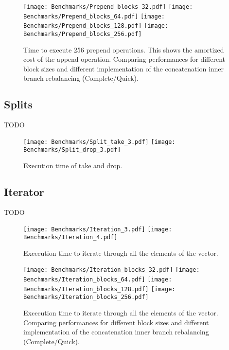 \begin{figure}[h!]
  \centering
  \texttt{[image: Benchmarks/Prepend\_blocks\_32.pdf]}
  \texttt{[image: Benchmarks/Prepend\_blocks\_64.pdf]}
  \texttt{[image: Benchmarks/Prepend\_blocks\_128.pdf]}
  \texttt{[image: Benchmarks/Prepend\_blocks\_256.pdf]}
  \label{PrependBenchmarks}
  \caption{Time to execute 256 prepend operations. This shows the amortized cost of the append operation. Comparing performances for different block sizes and different implementation of the concatenation inner branch rebalancing (Complete/Quick).}
\end{figure}


\subsection{Splits}
\color{red} TODO \color{black}

\begin{figure}[h!]
  \centering
  \texttt{[image: Benchmarks/Split\_take\_3.pdf]}
  \texttt{[image: Benchmarks/Split\_drop\_3.pdf]}
  \label{SplitsBenchmarks}
  \caption{Execution time of take and drop.}
\end{figure}


\subsection{Iterator}
\color{red} TODO \color{black}

\begin{figure}[h!]
  \centering
  \texttt{[image: Benchmarks/Iteration\_3.pdf]}
  \texttt{[image: Benchmarks/Iteration\_4.pdf]}
  \label{IterationBenchmarks}
  \caption{Excecution time to iterate through all the elements of the vector.}
\end{figure}

\begin{figure}[h!]
  \centering
  \label{IterationBlocksBenchmarks}
  \texttt{[image: Benchmarks/Iteration\_blocks\_32.pdf]}
  \texttt{[image: Benchmarks/Iteration\_blocks\_64.pdf]}
  \texttt{[image: Benchmarks/Iteration\_blocks\_128.pdf]}
  \texttt{[image: Benchmarks/Iteration\_blocks\_256.pdf]}
  \caption{Excecution time to iterate through all the elements of the vector. Comparing performances for different block sizes and different implementation of the concatenation inner branch rebalancing (Complete/Quick).}
\end{figure}


